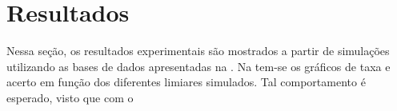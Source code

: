 \chapter[Resultados]{Resultados}
\label{resultados}
Nessa seção, os resultados experimentais são mostrados a partir de simulações utilizando as bases de dados apresentadas na . Na  tem-se os gráficos de taxa e acerto em função dos diferentes limiares simulados. Tal comportamento é esperado, visto que com o 